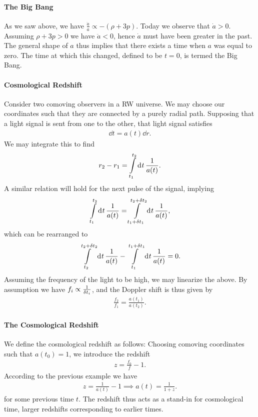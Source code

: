 \paragraph{The Big Bang}
As we saw above, we have $\frac{\ddot{a}}{a} \propto -(\rho + 3p)$. Today we observe that $\dot{a} > 0$. Assuming $\rho + 3p > 0$ we have $\ddot{a} < 0$, hence $\dot{a}$ must have been greater in the past. The general shape of $a$ thus implies that there exists a time when $a$ was equal to zero. The time at which this changed, defined to be $t = 0$, is termed the Big Bang.

\paragraph{Cosmological Redshift}
Consider two comoving observers in a RW universe. We may choose our coordinates such that they are connected by a purely radial path. Supposing that a light signal is sent from one to the other, that light signal satisfies
\begin{align*}
	\dd{t} = a(t)\dd{r}.
\end{align*}
We may integrate this to find
\begin{align*}
	r_{2} - r_{1} = \int\limits_{t_{1}}^{t_{2}}\dd[]{t}\frac{1}{a(t)}.
\end{align*}
A similar relation will hold for the next pulse of the signal, implying
\begin{align*}
	\int\limits_{t_{1}}^{t_{2}}\dd[]{t}\frac{1}{a(t)} = \int\limits_{t_{1} + \var{t_{1}}}^{t_{2} + \var{t_{2}}}\dd[]{t}\frac{1}{a(t)},
\end{align*}
which can be rearranged to
\begin{align*}
	\int\limits_{t_{2}}^{t_{2} + \var{t_{2}}}\dd[]{t}\frac{1}{a(t)} - \int\limits_{t_{1}}^{t_{1} + \var{t_{1}}}\dd[]{t}\frac{1}{a(t)} = 0.
\end{align*}
Assuming the frequency of the light to be high, we may linearize the above. By assumption we have $f_{i} \propto \frac{1}{\var{t_{i}}}$, and the Doppler shift is thus given by
\begin{align*}
	\frac{f_{2}}{f_{1}} = \frac{a(t_{1})}{a(t_{2})}.
\end{align*}

\paragraph{The Cosmological Redshift}
We define the cosmological redshift as follows: Choosing comoving coordinates such that $a(t_{0}) = 1$, we introduce the redshift
\begin{align*}
	z = \frac{f_{0}}{f} - 1.
\end{align*}
According to the previous example we have
\begin{align*}
	z = \frac{1}{a(t)} - 1 \implies a(t) = \frac{1}{1 + z}.
\end{align*}
for some previous time $t$. The redshift thus acts as a stand-in for cosmological time, larger redshifts corresponding to earlier times.

